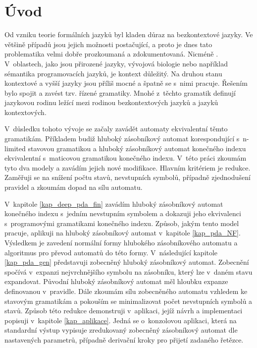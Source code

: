 
\chapter{Úvod}

Od vzniku teorie formálních jazyků byl kladen důraz na bezkontextové jazyky. Ve většině případů jsou jejich možnosti postačující, a proto je dnes tato problematika velmi dobře prozkoumaná a zdokumentovaná. Nicméně  \cite{Dassow:RegulatedRewriting}. V~oblastech, jako jsou přirozené jazyky, vývojová biologie nebo například sémantika programovacích jazyků, je kontext důležitý. Na druhou stanu kontextové a vyšší jazyky jsou příliš mocné a špatně se s~nimi pracuje. Řešením bylo spojit  \cite{Dassow:RegulatedRewriting} a zavést tzv. řízené gramatiky. Mnohé z~těchto gramatik definují jazykovou rodinu ležící mezi rodinou bezkontextových jazyků a jazyků kontextových.

V~důsledku tohoto vývoje se začaly zavádět automaty ekvivalentní těmto gramatikám. Příkladem budiž hluboký zásobníkový automat \cite{Meduna:DeepPDA} korespondující s~n-limited stavovou gramatikou a hluboký zásobníkový automat konečného indexu \cite{Meduna:FinitelyDeepPDA} ekvivalentní s~maticovou gramatikou konečného indexu. V~této práci zkoumám tyto dva modely a zavádím jejich nové modifikace. Hlavním kritériem je redukce. Zaměřuji se na snížení počtu stavů, nevstupních symbolů, případně zjednodušení pravidel a zkoumám dopad na sílu automatu.


V~kapitole \ref{kap_deep_pda_fin} zavádím hluboký zásobníkový automat konečného indexu s~jedním nevstupním symbolem a dokazuji jeho ekvivalenci s~programovými gramatikami konečného indexu. Způsob, jakým tento model pracuje, aplikuji na hluboký zásobníkový automat v~kapitole \ref{kap_pda_NF}. Výsledkem je zavedení normální formy hlubokého zásobníkového automatu a algoritmus pro převod automatů do této formy. V~následující kapitole \ref{kap_pda_gen} představuji zobecněný hluboký zásobníkový automat. Zobecnění spočívá v~expanzi nejvrchnějšího symbolu na zásobníku, který lze v~daném stavu expandovat. Původní hluboký zásobníkový automat měl hloubku expanze definovanou v~pravidle. Dále zkoumám sílu zobecněného automatu vzhledem ke stavovým gramatikám a pokouším se minimalizovat počet nevstupních symbolů a stavů. Způsob této redukce demonstruji v~aplikaci, jejíž návrh a implementaci popisuji v~kapitole \ref{kap_aplikace}. Jedná se o~konzolovou aplikaci, která na standardní výstup vypisuje zredukovaný zobecněný zásobníkový automat dle nastavených parametrů, případně derivační kroky pro přijetí zadaného řetězce.


